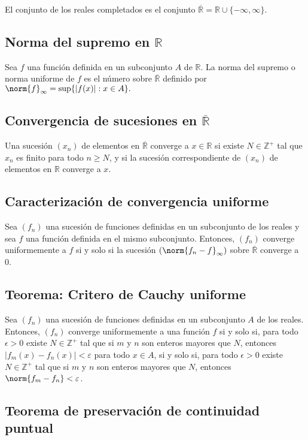 \documentclass{article}
\begin{document}
El conjunto de los reales completados es el conjunto $\overline{\mathbb{R}}=\mathbb{R}\cup\{-\infty,\infty\}$.

\subsection*{Norma del supremo en $\mathbb{R}$}

Sea $f$ una función definida en un subconjunto $A$ de $\mathbb{R}$. La norma del supremo o norma uniforme de $f$ es el número sobre $\overline{\mathbb{R}}$ definido por $\norm{f}_{\infty}=\sup\{|f(x)|: x\in A\}.$

\subsection*{Convergencia de sucesiones en $\overline{\mathbb{R}}$}

Una sucesión $(x_n)$ de elementos en $\overline{\mathbb{R}}$ converge a $x\in\mathbb{R}$ si existe $N\in\mathbb{Z}^+$ tal que $x_n$ es finito para todo $n\geq N$, y si la sucesión correspondiente de $(x_n)$ de elementos en $\mathbb{R}$ converge a $x$.

\subsection*{Caracterización de convergencia uniforme}

Sea $(f_n)$ una sucesión de funciones definidas en un subconjunto de los reales y sea $f$ una función definida en el mismo subconjunto. Entonces, $(f_n)$ converge uniformemente a $f$ si y solo si la sucesión $(\norm{f_n-f}_{\infty})$ sobre $\overline{\mathbb{R}}$ converge a 0.

\subsection*{Teorema: Critero de Cauchy uniforme}

Sea $(f_n)$ una sucesión de funciones definidas en un subconjunto $A$ de los reales. Entonces, $(f_n)$ converge uniformemente a una función $f$ si y solo si, para todo $\epsilon>0$ existe $N\in\mathbb{Z}^+$ tal que si $m$ y $n$ son enteros mayores que $N$, entonces $|f_m(x)-f_n(x)|<\varepsilon$ para todo $x\in A$, si y solo si, para todo $\epsilon>0$ existe $N\in\mathbb{Z}^+$ tal que si $m$ y $n$ son enteros mayores que $N$, entonces $\norm{f_m-f_n}<\varepsilon$.

\subsection*{Teorema de preservación de continuidad puntual}
\end{document}
